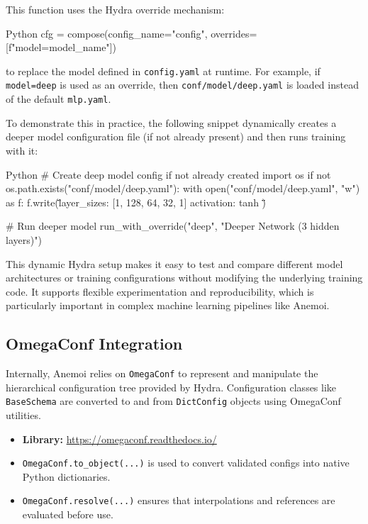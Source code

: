 This function uses the Hydra override mechanism:
\begin{codeonly}{Python}
cfg = compose(config_name="config", overrides=[f"model={model_name}"])
\end{codeonly}
to replace the model defined in \texttt{config.yaml} at runtime. For example, if \texttt{model=deep} is used as an override, then \texttt{conf/model/deep.yaml} is loaded instead of the default \texttt{mlp.yaml}.

To demonstrate this in practice, the following snippet dynamically creates a deeper model configuration file (if not already present) and then runs training with it:

\begin{codeonly}{Python}
# Create deep model config if not already created
import os
if not os.path.exists("conf/model/deep.yaml"):
    with open("conf/model/deep.yaml", "w") as f:
        f.write(\"\"\"
layer_sizes: [1, 128, 64, 32, 1]
activation: tanh
\"\"\")

# Run deeper model
run_with_override("deep", "Deeper Network (3 hidden layers)")
\end{codeonly}

This dynamic Hydra setup makes it easy to test and compare different model architectures or training configurations without modifying the underlying training code. It supports flexible experimentation and reproducibility, which is particularly important in complex machine learning pipelines like Anemoi.

%
\subsection{OmegaConf Integration}

Internally, Anemoi relies on \texttt{OmegaConf} to represent and manipulate the hierarchical configuration tree provided by Hydra. Configuration classes like \texttt{BaseSchema} are converted to and from \texttt{DictConfig} objects using OmegaConf utilities.

\begin{itemize}
  \item \textbf{Library:} \url{https://omegaconf.readthedocs.io/}
  \item \texttt{OmegaConf.to\_object(...)} is used to convert validated configs into native Python dictionaries.
  \item \texttt{OmegaConf.resolve(...)} ensures that interpolations and references are evaluated before use.
\end{itemize}

